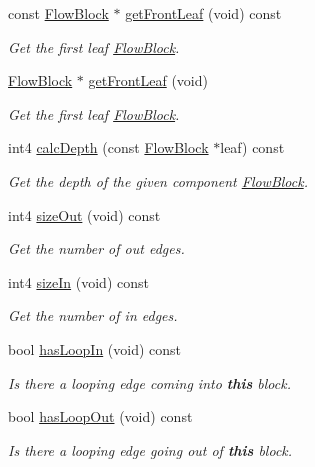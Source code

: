 \begin{DoxyCompactItemize}
const \mbox{\hyperlink{class_flow_block}{Flow\+Block}} $\ast$ \mbox{\hyperlink{class_flow_block_af351e164076032e278a238cbb570710c}{get\+Front\+Leaf}} (void) const
\begin{DoxyCompactList}\small\item\em Get the first leaf \mbox{\hyperlink{class_flow_block}{Flow\+Block}}. \end{DoxyCompactList}\item 
\mbox{\hyperlink{class_flow_block}{Flow\+Block}} $\ast$ \mbox{\hyperlink{class_flow_block_a79329e1df72d004f0b7b8ff475e0143d}{get\+Front\+Leaf}} (void)
\begin{DoxyCompactList}\small\item\em Get the first leaf \mbox{\hyperlink{class_flow_block}{Flow\+Block}}. \end{DoxyCompactList}\item 
int4 \mbox{\hyperlink{class_flow_block_af611c90c1974b257161c37860065c011}{calc\+Depth}} (const \mbox{\hyperlink{class_flow_block}{Flow\+Block}} $\ast$leaf) const
\begin{DoxyCompactList}\small\item\em Get the depth of the given component \mbox{\hyperlink{class_flow_block}{Flow\+Block}}. \end{DoxyCompactList}\item 
int4 \mbox{\hyperlink{class_flow_block_abf4424ddc9e448fcd52e72ebe9fb8a2b}{size\+Out}} (void) const
\begin{DoxyCompactList}\small\item\em Get the number of out edges. \end{DoxyCompactList}\item 
int4 \mbox{\hyperlink{class_flow_block_aab379442c099264f10c1f1f3b9ecf5fe}{size\+In}} (void) const
\begin{DoxyCompactList}\small\item\em Get the number of in edges. \end{DoxyCompactList}\item 
bool \mbox{\hyperlink{class_flow_block_a54d8e26d57d72d73f4ae36744eccf85d}{has\+Loop\+In}} (void) const
\begin{DoxyCompactList}\small\item\em Is there a looping edge coming into {\bfseries{this}} block. \end{DoxyCompactList}\item 
bool \mbox{\hyperlink{class_flow_block_af871bdc2674a0bcc53c9886e57e70f72}{has\+Loop\+Out}} (void) const
\begin{DoxyCompactList}\small\item\em Is there a looping edge going out of {\bfseries{this}} block. \end{DoxyCompactList}\item 

\end{DoxyCompactItemize}
